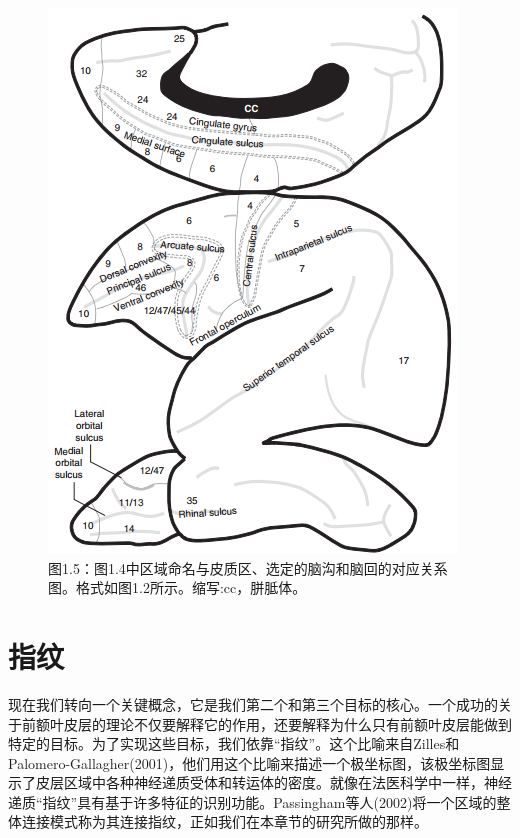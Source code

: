 \begin{figure}[!htb]
	\centering
	\includegraphics[width=0.5\linewidth]{image_pfc/Fig_1_5}
	\caption{图1.5：图1.4中区域命名与皮质区、选定的脑沟和脑回的对应关系图。格式如图1.2所示。缩写:cc，胼胝体。\label{fig:fig_1_5}}
\end{figure}



\section{指纹}
现在我们转向一个关键概念，它是我们第二个和第三个目标的核心。一个成功的关于前额叶皮层的理论不仅要解释它的作用，还要解释为什么只有前额叶皮层能做到特定的目标。为了实现这些目标，我们依靠“指纹”。这个比喻来自Zilles和Palomero-Gallagher(2001)，他们用这个比喻来描述一个极坐标图，该极坐标图显示了皮层区域中各种神经递质受体和转运体的密度。就像在法医科学中一样，神经递质“指纹”具有基于许多特征的识别功能。Passingham等人(2002)将一个区域的整体连接模式称为其连接指纹，正如我们在本章节的研究所做的那样。


